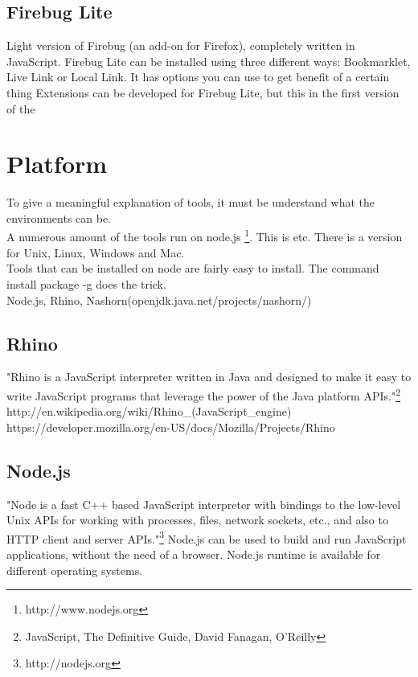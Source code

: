 \documentclass{article}
\begin{document}
\subsection {Firebug Lite}
Light version of Firebug (an add-on for Firefox), completely written in JavaScript.
Firebug Lite can be installed using three different ways: Bookmarklet, Live Link or Local Link.
It has options you can use to get benefit of a certain thing
Extensions can be developed for Firebug Lite, but this in the first version of the 

\section{Platform}
To give a meaningful explanation of tools, it must be understand what the environments can be.\\
A numerous amount of the tools run on node.js \footnote{http://www.nodejs.org}. This is etc.
There is a version for Unix, Linux, Windows and Mac.\\
Tools that can be installed on node are fairly easy to install. The command install package -g does the trick.\\
Node.js, Rhino, Nashorn(openjdk.java.net/projects/nashorn/)

\subsection{Rhino}
"Rhino is a JavaScript interpreter written in Java and designed to make it easy to write JavaScript programs that leverage the power of the Java platform APIs."\footnote{JavaScript, The Definitive Guide, David Fanagan, O'Reilly}\newline
http://en.wikipedia.org/wiki/Rhino\_(JavaScript\_engine)
https://developer.mozilla.org/en-US/docs/Mozilla/Projects/Rhino

\subsection{Node.js}
"Node is a fast C++ based JavaScript interpreter with bindings to the low-level 
Unix APIs for working with processes, files, network sockets, etc., and also to 
HTTP client and server APIs."\footnote{http://nodejs.org}
Node.js can be used to build and run JavaScript applications, without the need of a browser.
Node.js runtime is available for different operating systems.
\end{document}
